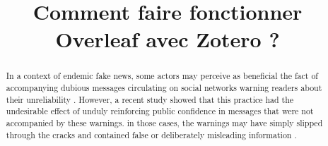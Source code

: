 \documentclass[12pt]{article}
\begin{document}
\title{Comment faire fonctionner Overleaf avec Zotero ?}
\maketitle

\begin{abstract}

In a context of endemic fake news, some actors may perceive as beneficial the fact of accompanying dubious messages circulating on social networks warning readers about their unreliability \cite{claveyMastodonRefugePour2023}. However, a recent study showed that this practice had the undesirable effect of unduly reinforcing public confidence in messages that were not accompanied by these warnings. in those cases, the warnings may have simply slipped through the cracks and contained false or deliberately misleading information \cite{ertzscheidSiUniversitesRestaient2024}.


\end{abstract}

\printbibliography
\end{document}
